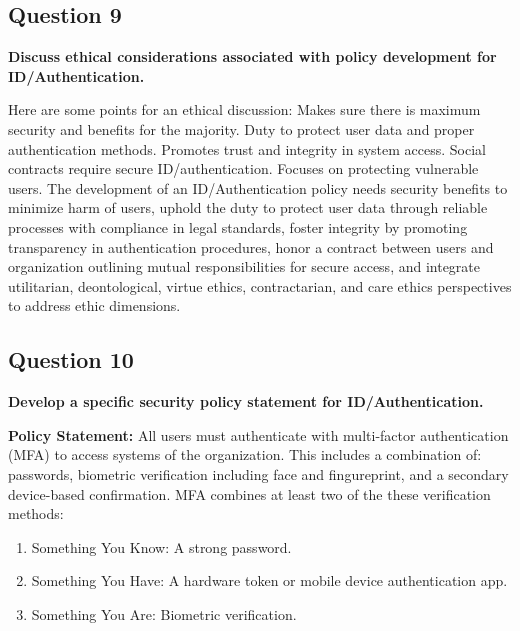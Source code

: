 \documentclass[12pt]{article}
\begin{document}
\subsection*{Question 9}
\textbf{Discuss ethical considerations associated with policy development for ID/Authentication.}

Here are some points for an ethical discussion: 
Makes sure there is maximum security and benefits for the majority.
Duty to protect user data and  proper authentication methods.
Promotes trust and integrity in system access.
Social contracts require secure ID/authentication.
Focuses on protecting vulnerable users.
The development of an ID/Authentication policy needs security benefits to minimize harm of users, uphold the duty to protect user data through reliable processes with compliance in legal standards, foster integrity by promoting transparency in authentication procedures, honor a contract between users and organization outlining mutual responsibilities for secure access, and integrate utilitarian, deontological, virtue ethics, contractarian, and care ethics perspectives to address ethic dimensions.

\subsection*{Question 10}
\textbf{Develop a specific security policy statement for ID/Authentication.}

\textbf{Policy Statement:}
All users must authenticate with multi-factor authentication (MFA) to access systems of the organization. This includes a combination of: passwords, biometric verification including face and fingureprint, and a secondary device-based confirmation. MFA combines at least two of the these verification methods:

\begin{enumerate}
    \item Something You Know: A strong password.
    \item Something You Have: A hardware token or mobile device authentication app.
    \item Something You Are: Biometric verification.
\end{enumerate} 
\end{document}
